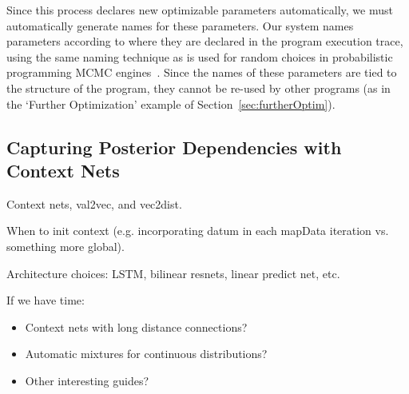 Since this process declares new optimizable parameters automatically, we must automatically generate names for these parameters. Our system names parameters according to where they are declared in the program execution trace, using the same naming technique as is used for random choices in probabilistic programming MCMC engines~\cite{Lightweight}. Since the names of these parameters are tied to the structure of the program, they cannot be re-used by other programs (as in the `Further Optimization' example of Section~\ref{sec:furtherOptim}).

\subsection{Capturing Posterior Dependencies with Context Nets}

Context nets, val2vec, and vec2dist.

When to init context (e.g. incorporating datum in each mapData iteration vs. something more global).

Architecture choices: LSTM, bilinear resnets, linear predict net, etc.

If we have time:
\begin{itemize}
\item{Context nets with long distance connections?}
\item{Automatic mixtures for continuous distributions?}
\item{Other interesting guides?}
\end{itemize}


